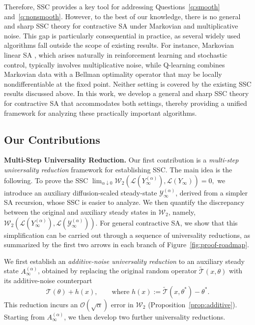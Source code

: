 \documentclass[11pt,letterpaper]{article}
\theoremstyle{plain}
\theoremstyle{definition}
\theoremstyle{remark}
\newcommand{\mT}{\mathcal{T}}
\newcommand{\W}{\mathcal{W}}
\newcommand{\tmT}{\widetilde{\mT}}
\newcommand{\law}{\mathcal{L}}
\begin{document}
Therefore, SSC provides a key tool for addressing
Questions~\ref{q:smooth} and~\ref{q:nonsmooth}. However, to the best of our
knowledge, there is no general and sharp SSC theory for
contractive SA under Markovian and multiplicative noise. This gap is particularly consequential
in practice, as several widely used algorithms fall outside the scope of
existing results. For instance, Markovian linear SA \citep{srikant2019finite}, which arises naturally in
reinforcement learning and stochastic control, typically involves
multiplicative noise, while Q-learning \citep{Watkins92-QLearning} combines Markovian data with a Bellman
optimality operator that may be locally nondifferentiable at the fixed point.
Neither setting is covered by the existing SSC results
discussed above. In this work, we develop a general and sharp SSC theory for contractive SA that accommodates both settings, thereby
providing a unified framework for analyzing these practically important
algorithms.


\subsection{Our Contributions}\label{sec:contribution}
\noindent\textbf{Multi-Step Universality Reduction.}
Our first contribution is a \emph{multi-step universality reduction}
framework for establishing SSC. The main idea is the
following. To prove the SSC $\lim_{\alpha\downarrow 0}
\W_2\!\left(
    \law\!\left(Y_\infty^{(\alpha)}\right),
    \law\!\left(Y_\infty\right)
\right)
=
0,$ we introduce an auxiliary diffusion-scaled steady-state
$\mathcal Y_\infty^{(\alpha)}$, derived from a simpler SA recursion, whose SSC
is easier to analyze. We then quantify the discrepancy between the original and
auxiliary steady states in $\W_2$, namely, $\W_2\!\left(
    \law\!\left(Y_\infty^{(\alpha)}\right),
    \law\!\left(\mathcal Y_\infty^{(\alpha)}\right)
\right).$ For general contractive SA, we show that this simplification can be carried
out through a sequence of universality reductions, as summarized by the first
two arrows in each branch of Figure~\ref{fig:proof-roadmap}.

We first establish an \emph{additive-noise universality reduction} to an
auxiliary steady state $A_\infty^{(\alpha)}$, obtained by replacing the
original random operator $\tmT(x,\theta)$ with its additive-noise
counterpart
\[
\mT(\theta)+h(x),
\qquad\mbox{where }
h(x):=\tmT(x,\theta^*)-\theta^*.
\]
This reduction incurs an $\mathcal O(\sqrt{\alpha})$ error in $\W_2$
(Proposition~\ref{prop:additive}). Starting from $A_\infty^{(\alpha)}$, we then develop two further universality
reductions.
\end{document}
